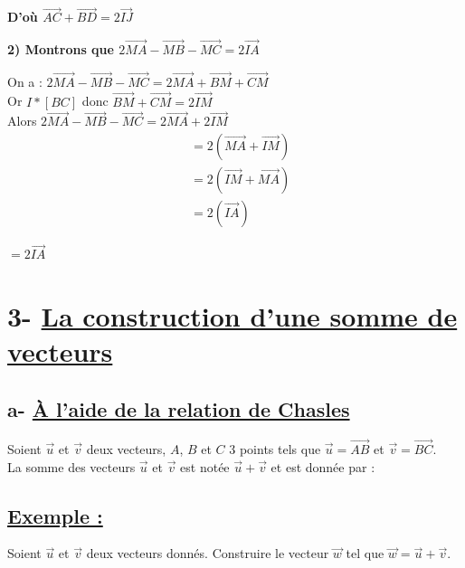 \documentclass{article}
\begin{document}
\noindent \textbf{D'où $\overrightarrow{AC} + \overrightarrow{BD} = 2\overrightarrow{IJ}$}

\vspace{2em}

\noindent \textbf{2) Montrons que $2\overrightarrow{MA} - \overrightarrow{MB} - \overrightarrow{MC} = 2\overrightarrow{IA}$}

\vspace{1em}

\noindent On a : $2\overrightarrow{MA} - \overrightarrow{MB} - \overrightarrow{MC} = 2\overrightarrow{MA} + \overrightarrow{BM} + \overrightarrow{CM}$ \\
\noindent Or $I * [BC]$ donc $\overrightarrow{BM} + \overrightarrow{CM} = 2\overrightarrow{IM}$ \\
\noindent Alors $2\overrightarrow{MA} - \overrightarrow{MB} - \overrightarrow{MC} = 2\overrightarrow{MA} + 2\overrightarrow{IM}$
\begin{align*}
&= 2(\overrightarrow{MA} + \overrightarrow{IM}) \\
&= 2(\overrightarrow{IM} + \overrightarrow{MA}) \\
&= 2(\overrightarrow{IA})
\end{align*}

\noindent \textbf{$= 2\overrightarrow{IA}$}


\section*{3- \underline{La construction d'une somme de vecteurs}}

\subsection*{a- \underline{À l'aide de la relation de Chasles}}

\noindent Soient $\vec{u}$ et $\vec{v}$ deux vecteurs, $A$, $B$ et $C$ 3 points tels que $\vec{u} = \overrightarrow{AB}$ et $\vec{v} = \overrightarrow{BC}$. \\
La somme des vecteurs $\vec{u}$ et $\vec{v}$ est notée $\vec{u} + \vec{v}$ et est donnée par :

\begin{center}
    \color{red}
\end{center}

\vspace{1em}

\subsection*{\underline{Exemple :}}
\noindent Soient $\vec{u}$ et $\vec{v}$ deux vecteurs donnés. Construire le vecteur $\vec{w}$ tel que $\vec{w} = \vec{u} + \vec{v}$.
\end{document}
